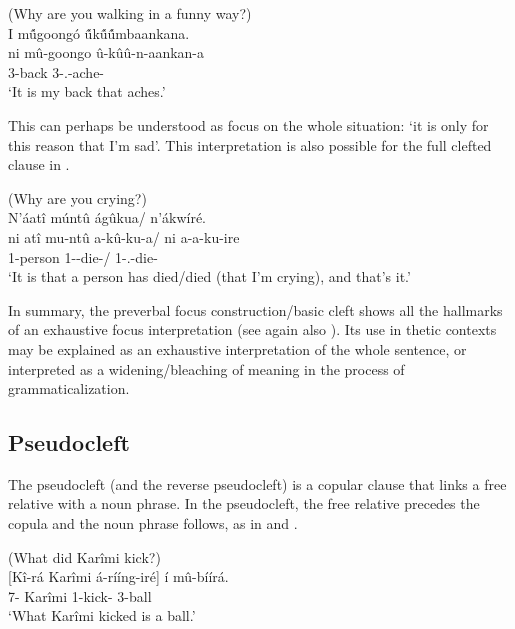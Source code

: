 \documentclass[output=paper]{langscibook}
\begin{document}
\z

\ea
\label{bkm:Ref111803121}
(Why are you walking in a funny way?)\\
I m\'{û}goongó \'{û}k\'{û}\'{û}mbaankana.\\
\gll
ni  mû-goongo  û-kûû-n-aankan-a\\
\FOC{} 3-back 3\SM-\SG.\OM{}-ache-\FV{}\\
\glt
‘It is my back that aches.’

\z


This can perhaps be understood as focus on the whole situation: ‘it is only for this reason that I’m sad’. This interpretation is also possible for the full clefted clause in .

\ea
\label{bkm:Ref117496479}
(Why are you crying?)\\
N’áatî múntû ágûkua/ n’ákwíré.\\
\gll
ni  atî   mu-ntû   a-kû-ku-a/  ni  a-a-ku-ire\\
\FOC{} \COMP{} 1-person 1\SM-\PRS{}-die-\FV{}/ \FOC{}  1\SM{}-\N.\PST{}-die-\PFV{}\\
\glt
‘It is that a person has died/died (that I’m crying), and that’s it.’

\z


In summary, the preverbal focus construction/basic cleft shows all the hallmarks of an exhaustive focus interpretation (see again also \citealt{AbelsMuriungi2008}). Its use in thetic contexts may be explained as an exhaustive interpretation of the whole sentence, or interpreted as a widening/bleaching of meaning in the process of grammaticalization.

\subsection{Pseudocleft}
\label{bkm:Ref132101501}\label{bkm:Ref132101940}
The pseudocleft (and the reverse pseudocleft) is a copular clause that links a free relative with a noun phrase. In the pseudocleft, the free relative precedes the copula and the noun phrase follows, as in  and .

\ea
\label{bkm:Ref132103821}
(What did Karîmi kick?)\\
\gll {}[Kî-rá  Karîmi  á-rííng-iré]  í  mû-bíírá. \\
{\db}7-\RM{} Karîmi 1\SM{}-kick-\PFV{} \COP{} 3-ball\\
\glt
‘What Karîmi kicked is a ball.’
\end{document}
